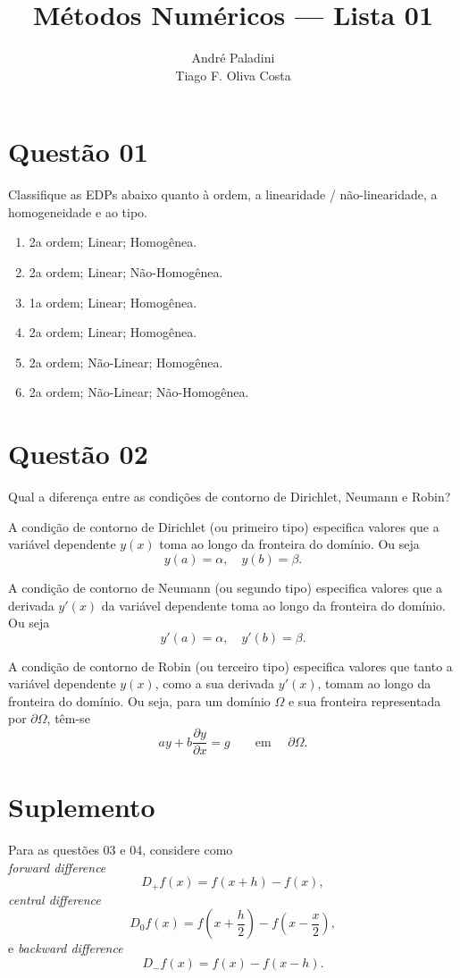 \documentclass{article}
\title{Métodos Numéricos --- Lista 01}
\author{André Paladini  \quad 14182390 \\ Tiago F. Oliva Costa \quad 8004408 }
\begin{document}
\maketitle

\section{Questão 01}
Classifique as EDPs abaixo quanto à ordem, a linearidade / não-linearidade, a homogeneidade e ao tipo.

\begin{enumerate}[label=\Alph*]
\item 2a ordem; Linear; Homogênea.
\item 2a ordem; Linear; Não-Homogênea.
\item 1a ordem; Linear; Homogênea.
\item 2a ordem; Linear; Homogênea.
\item 2a ordem; Não-Linear; Homogênea.
\item 2a ordem; Não-Linear; Não-Homogênea.
\end{enumerate}

\section{Questão 02}
Qual a diferença entre as condições de contorno de Dirichlet, Neumann e Robin?

A condição de contorno de Dirichlet (ou primeiro tipo) especifica valores que a variável dependente $y(x)$ toma ao longo da fronteira do domínio. Ou seja
\[ y(a) = \alpha, \quad y(b) = \beta. \]

A condição de contorno de Neumann (ou segundo tipo) especifica valores que a derivada $y'(x)$ da variável dependente  toma ao longo da fronteira do domínio. Ou seja
\[ y'(a) = \alpha, \quad y'(b) = \beta. \]

A condição de contorno de Robin (ou terceiro tipo) especifica valores que tanto a variável dependente $y(x)$, como a sua derivada $y'(x)$, tomam ao longo da fronteira do domínio. Ou seja, para um domínio $\Omega$ e sua fronteira representada por $\partial \Omega$, têm-se
\[ a y + b \frac{\partial y}{\partial x} =g \qquad \text{em } \quad \partial \Omega.\]

\section{Suplemento}
Para as questões 03 e 04, considere como\\
\emph{forward difference}
\[
	D_+ f(x) = f(x+h) - f(x),
\]
\emph{central difference}
\[
	D_0 f(x) = f(x+\frac{h}{2}) - f(x - \frac{x}{2}),
\]
e \emph{backward difference}
\[
	D_- f(x) = f(x) - f(x-h).
\]
\end{document}
